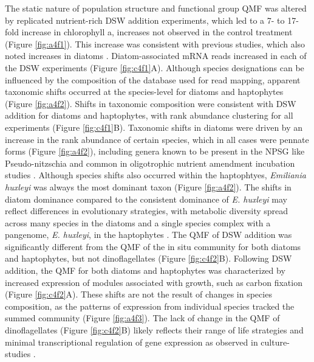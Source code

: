 The static nature of population structure and functional group QMF was altered by replicated nutrient-rich DSW addition experiments, which led to a 7- to 17-fold increase in chlorophyll a, increases not observed in the control treatment (Figure \ref{fig:a4f1}). This increase was consistent with previous studies, which also noted increases in diatoms \citep{McAndrew2007}. Diatom-associated mRNA reads increased in each of the DSW experiments (Figure \ref{fig:c4f1}A). Although species designations can be influenced by the composition of the database used for read mapping, apparent taxonomic shifts occurred at the species-level for diatoms and haptophytes (Figure \ref{fig:a4f2}). Shifts in taxonomic composition were consistent with DSW addition for diatoms and haptophytes, with rank abundance clustering for all experiments (Figure \ref{fig:c4f1}B).  Taxonomic shifts in diatoms were driven by an increase in the rank abundance of certain species, which in all cases were pennate forms (Figure \ref{fig:a4f2}), including genera known to be present in the NPSG like Pseudo-nitzschia \citep{Silver2010} and common in oligotrophic nutrient amendment incubation studies \citep{Marchetti2005, Marchetti2012a}. Although species shifts also occurred within the haptophtyes, \textit{Emiliania huxleyi} was always the most dominant taxon (Figure \ref{fig:a4f2}). The shifts in diatom dominance compared to the consistent dominance of \textit{E. huxleyi} may reflect differences in evolutionary strategies, with metabolic diversity spread across many species in the diatoms and a single species complex with a pangenome, \textit{E. huxleyi}, in the haptophytes \citep{Read2013}. The QMF of DSW addition was significantly different from the QMF of the in situ community for both diatoms and haptophytes, but not dinoflagellates (Figure \ref{fig:c4f2}B). Following DSW addition, the QMF for both diatoms and haptophytes was characterized by increased expression of modules associated with growth, such as carbon fixation (Figure \ref{fig:c4f2}A). These shifts are not the result of changes in species composition, as the patterns of expression from individual species tracked the summed community (Figure \ref{fig:a4f3}). The lack of change in the QMF of dinoflagellates (Figure \ref{fig:c4f2}B) likely reflects their range of life strategies \citep{Hackett2004} and minimal transcriptional regulation of gene expression as observed in culture-studies \citep{Moustafa2010}. \par


